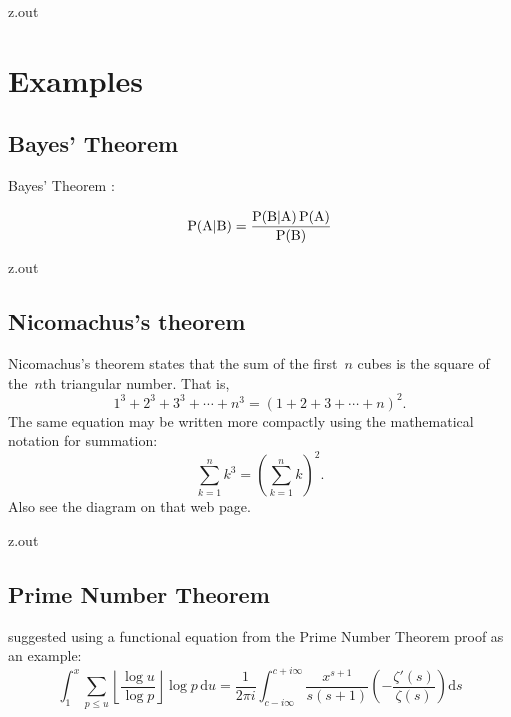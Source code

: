 \begin{VerbatimOut}{z.out}


\section{Examples}

\subsection{Bayes' Theorem}

Bayes' Theorem
\cite{bayes}:

{
  \UndefineShortVerb{\|}
\[
  \text{P}(\text A|\text B)
    = \frac{\text P(\text B|\text A)\,\text P(\text A)}{\text P(\text B)}
\]
}
\end{VerbatimOut}

\MyIO


\begin{VerbatimOut}{z.out}

\subsection{Nicomachus's theorem}

Nicomachus's theorem
\cite{wikipedia-nicomachus}
states that
the sum of the first~\(n\) cubes is the square of the~\(n\)th triangular number.
That is,
\[
  1^3 + 2^3 + 3^3 + \cdots + n^3 = (1 + 2 + 3 + \cdots + n)^2.
\]
The same equation may be written more compactly using the mathematical notation for summation:
\[
  \sum_{k=1}^n k^3 = \left(\sum_{k=1}^n k\right)^2.
\]
Also see the diagram on that web page.
\end{VerbatimOut}

\MyIO


\begin{VerbatimOut}{z.out}

\subsection{Prime Number Theorem}

\textcite{li2013}
suggested using a functional equation
from the Prime Number Theorem proof
as an example:
\begin{equation}
  \int_1^x
    \sum_{p\le u}
    \left\lfloor\frac{\log u}{\log p}\right\rfloor
    \log p
    \,\text{d}u
    =
    \frac1{2\pi i}
    \int_{c-i\infty}^{c+i\infty}
    \frac{x^{s+1}}{s(s+1)}
    \left(-\frac{\zeta'(s)}{\zeta(s)}\right)
    \text{d}s
\end{equation}
\end{VerbatimOut}

